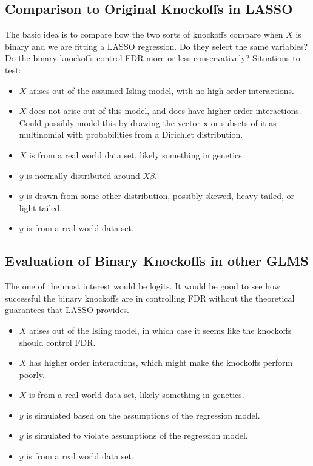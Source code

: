 \documentclass[11pt]{article}
\theoremstyle{definition}
\begin{document}
\subsection{Comparison to Original Knockoffs in LASSO}
The basic idea is to compare how the two sorts of knockoffs compare when $X$ is binary and we are fitting a LASSO regression. Do they select the same variables? Do the binary knockoffs control FDR more or less conservatively? Situations to test:
\begin{itemize}
    \item $X$ arises out of the assumed Isling model, with no high order interactions. 
    \item $X$ does not arise out of this model, and does have higher order interactions. Could possibly model this by drawing the vector $\mathbf x$ or subsets of it as multinomial with probabilities from a Dirichlet distribution.
    \item $X$ is from a real world data set, likely something in genetics.
    \item $y$ is normally distributed around $X\beta$.
    \item $y$ is drawn from some other distribution, possibly skewed, heavy tailed, or light tailed.
    \item $y$ is from a real world data set.
\end{itemize}

\subsection{Evaluation of Binary Knockoffs in other GLMS}
The one of the most interest would be logits. It would be good to see how successful the binary knockoffs are in controlling FDR without the theoretical guarantees that LASSO provides.
\begin{itemize}
    \item $X$ arises out of the Isling model, in which case it seems like the knockoffs should control FDR.
    \item $X$ has higher order interactions, which might make the knockoffs perform poorly.
    \item $X$ is from a real world data set, likely something in genetics.
    \item $y$ is simulated based on the assumptions of the regression model.
    \item $y$ is simulated to violate assumptions of the regression model.
    \item $y$ is from a real world data set.
\end{itemize}
\end{document}
